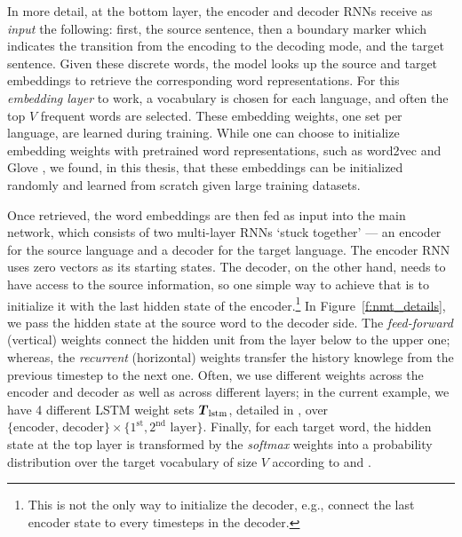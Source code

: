 In more detail, at the bottom layer, the encoder and decoder RNNs receive as
{\it input} the following: first,
the source sentence, then a boundary marker \word{\_} which indicates the
transition from the encoding to the decoding mode, and the target sentence. 
Given these discrete words, the model looks up the source and target
embeddings to retrieve the corresponding word representations.
For this {\it embedding layer} to work, a vocabulary is chosen for each language, and
often the top $V$ frequent words are selected.
These embedding weights, one set per language, are learned during training.
While one can choose to initialize embedding weights with pretrained word
representations, such as word2vec \cite{mikolov13nips} and Glove
\cite{pennington2014}, we found, in this thesis, that these
embeddings can be initialized randomly and learned from scratch given large training datasets.


Once retrieved, the word embeddings are then fed as input into the main network, which consists
of two multi-layer RNNs `stuck together' --- an encoder for the source
language and a decoder for the target language. 
The encoder RNN uses zero vectors as its starting states. The decoder, on the
other hand, needs to have access to the source information, so one simple way to
achieve that is to
initialize it with the last hidden state of the encoder.\footnote{This is not the only way to initialize the decoder,
e.g.,  connect the last encoder state to every timesteps in the
decoder.} In Figure~\ref{f:nmt_details}, we pass  
the hidden state at the source word  to the decoder side.
The \emph{feed-forward} (vertical) weights connect
the hidden unit from the layer below to the upper one; whereas, the
\emph{recurrent} (horizontal) weights transfer the history knowlege from the previous
timestep to the next one.
Often, we use different weights across the encoder and decoder as well as
across different layers; in the current example, we have 4 different LSTM
weight sets $\mbox{\boldmath{$T$}}_{\text{lstm}}$, detailed in , over $\{\text{encoder,
decoder}\} \times \{1^{\text{st}}, 2^{\text{nd}} \text{ layer}\}$.
Finally, for each target word, the hidden state at the top layer is transformed by the
\emph{softmax} weights into a probability distribution over the target
vocabulary of size $V$ according to  and . 

